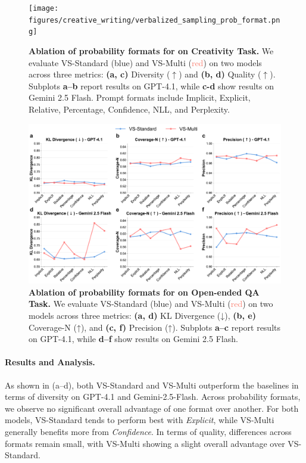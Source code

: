 \begin{figure}[h]
    \centering
    \texttt{[image: figures/creative\_writing/verbalized\_sampling\_prob\_format.png]}
    \caption{\textbf{Ablation of probability formats for \ours on Creativity Task.} We evaluate VS-Standard (\textcolor{ProcessBlue}{blue}) and VS-Multi (\textcolor{Salmon}{red}) on two models across three metrics: \textbf{(a, c)} Diversity ($\uparrow$) and \textbf{(b, d)} Quality ($\uparrow$). Subplots \textbf{a–b} report results on GPT-4.1, while \textbf{c-d} show results on Gemini 2.5 Flash. Prompt formats include Implicit, Explicit, Relative, Percentage, Confidence, NLL, and Perplexity. 
    }
    \label{fig:ablation_bias_probability_prompts}
\end{figure}

\begin{figure}[h]
    \centering
    \includegraphics[width=1\linewidth]{figures//ablation/bias_prompts_ablation_line_chart.pdf}
    \caption{\textbf{Ablation of probability formats for \ours on Open-ended QA Task.} We evaluate VS-Standard (\textcolor{ProcessBlue}{blue}) and VS-Multi (\textcolor{Salmon}{red}) on two models across three metrics: \textbf{(a, d)} KL Divergence (↓), \textbf{(b, e)} Coverage-N (↑), and \textbf{(c, f)} Precision (↑). Subplots \textbf{a–c} report results on GPT-4.1, while \textbf{d–f} show results on Gemini 2.5 Flash.
    }
    \label{fig:ablation_bias_probability_prompts}
\end{figure}

\paragraph{Results and Analysis.} 
As shown in  (a–d), both VS-Standard and VS-Multi outperform the baselines in terms of diversity on GPT-4.1 and Gemini-2.5-Flash. Across probability formats, we observe no significant overall advantage of one format over another. For both models, VS-Standard tends to perform best with \textit{Explicit}, while VS-Multi generally benefits more from \textit{Confidence}. In terms of quality, differences across formats remain small, with VS-Multi showing a slight overall advantage over VS-Standard.  

